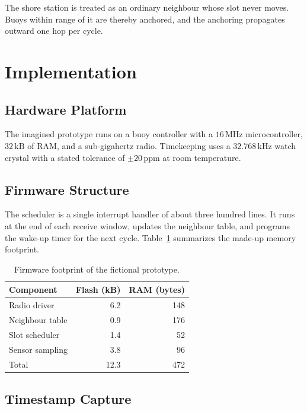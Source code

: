 \documentclass[conference]{IEEEtran}
\newcommand{\kb}{\,\mathrm{kB}}
\begin{document}
The shore station is treated as an ordinary neighbour whose slot never moves.
Buoys within range of it are thereby anchored, and the anchoring propagates
outward one hop per cycle.

\section{Implementation}
\label{sec:impl}

\subsection{Hardware Platform}
\label{sec:impl-hw}

The imagined prototype runs on a buoy controller with a $16$\,MHz
microcontroller, $32\kb$ of RAM, and a sub-gigahertz radio. Timekeeping uses a
$32.768$\,kHz watch crystal with a stated tolerance of $\pm 20$\,ppm at room
temperature.

\subsection{Firmware Structure}
\label{sec:impl-fw}

The scheduler is a single interrupt handler of about three hundred lines. It
runs at the end of each receive window, updates the neighbour table, and
programs the wake-up timer for the next cycle. Table~\ref{tab:footprint}
summarizes the made-up memory footprint.

\begin{table}[t]
  \caption{Firmware footprint of the fictional prototype.}
  \label{tab:footprint}
  \centering
  \begin{tabular}{lrr}
    \toprule
    Component & Flash (kB) & RAM (bytes) \\
    \midrule
    Radio driver & 6.2 & 148 \\
    Neighbour table & 0.9 & 176 \\
    Slot scheduler & 1.4 & 52 \\
    Sensor sampling & 3.8 & 96 \\
    \midrule
    Total & 12.3 & 472 \\
    \bottomrule
  \end{tabular}
\end{table}

\subsection{Timestamp Capture}
\label{sec:impl-ts}
\end{document}

